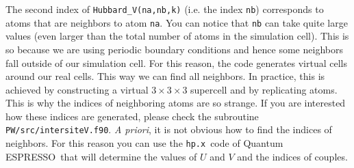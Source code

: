 \documentclass[12pt,a4paper]{article}
\def\qe{{\sc Quantum ESPRESSO}}
\def\hp{\texttt{hp.x}}
\begin{document}
\noindent
The second index of \texttt{Hubbard\_V(na,nb,k)} (i.e. the index \texttt{nb}) corresponds to atoms that are neighbors to atom \texttt{na}. You can notice that \texttt{nb} can take quite large values (even larger than the total number of atoms in the simulation cell). This is so because we are using periodic boundary conditions and hence some neighbors fall outside of our simulation cell. For this reason, the code generates virtual cells around our real cells. This way we can find all neighbors. In practice, this is achieved by constructing a virtual $3 \times 3 \times 3$ supercell and by replicating atoms. This is why the indices of neighboring atoms are so strange. If you are interested how these indices are generated, please check the subroutine \texttt{PW/src/intersiteV.f90}. {\it A priori}, it is not obvious how to find the indices of neighbors. For this reason you can use the \hp\ code of \qe\ that will determine the values of $U$ and $V$ and the indices of couples.\\
\end{document}
